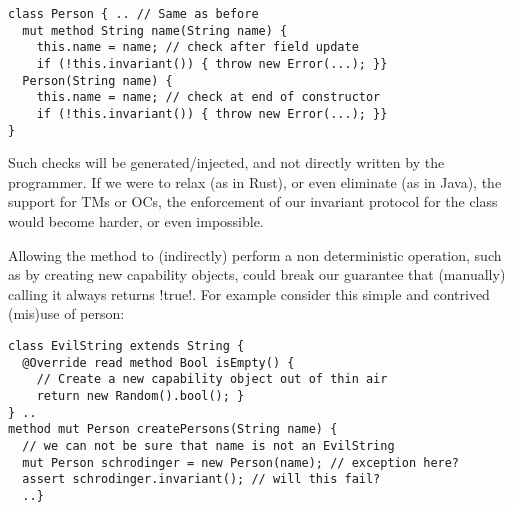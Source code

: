 
\begin{lstlisting}
class Person { .. // Same as before
  mut method String name(String name) {
    this.name = name; // check after field update
    if (!this.invariant()) { throw new Error(...); }}
  Person(String name) {
    this.name = name; // check at end of constructor
    if (!this.invariant()) { throw new Error(...); }}
}
\end{lstlisting}
%

Such checks will be generated/injected, and not directly written by the programmer. If we were to relax (as in Rust), or even eliminate (as in Java), the support for TMs or OCs, the enforcement of our invariant protocol for the \Q@Person@ class would become harder, or even impossible. 

 Allowing the \Q@invariant@ method to (indirectly) perform a non deterministic operation, such as by creating new capability objects, could break our guarantee that (manually) calling it always returns \Q!true!.
% 
For example consider this simple and contrived (mis)use of person:
\begin{lstlisting}[morekeywords={assert}]
class EvilString extends String {
  @Override read method Bool isEmpty() {
    // Create a new capability object out of thin air
    return new Random().bool(); }
} ..
method mut Person createPersons(String name) {
  // we can not be sure that name is not an EvilString
  mut Person schrodinger = new Person(name); // exception here?
  assert schrodinger.invariant(); // will this fail?
  ..}
\end{lstlisting}

